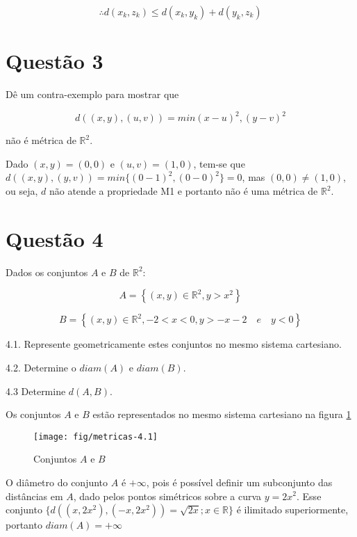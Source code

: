 \documentclass[10pt,a4paper]{article}
\begin{document}
	\begin{equation}\label{eq:M3a}
		\therefore d(x_k, z_k) \le d(x_k, y_k) + d(y_k, z_k)
	\end{equation}
	
	\section*{Questão 3}
	
	Dê um contra-exemplo para mostrar que
	
	\begin{equation}
		d((x, y), (u, v)) = min{(x-u)^2, (y-v)^2}
	\end{equation}
	
	não é métrica de $ \mathbb{R}^2$.
	
	Dado $ (x, y) = (0, 0) $ e $ (u, v) = (1, 0) $, tem-se que $ d((x, y), (y, v)) = min\{(0 - 1)^2, (0-0)^2\} = 0 $, mas $(0, 0) \neq (1, 0) $, ou seja, $d$ não atende a propriedade M1 e portanto não é uma métrica de $ \mathbb{R}^2$.
	\section*{Questão 4}
	
	Dados os conjuntos $A$ e $B$ de $\mathbb{R}^2$:
	
	\begin{equation*}
		A = \left\{ (x, y) \in \mathbb{R}^2, y > x^2 \right\}
	\end{equation*}
	
	\begin{equation*}
		B = \left\{ (x, y) \in \mathbb{R} ^2, -2 < x < 0, y > -x-2 \quad e \quad y < 0 \right\}
	\end{equation*}
	
	4.1. Represente geometricamente estes conjuntos no mesmo sistema cartesiano.
	
	4.2. Determine o $ diam(A) $ e $ diam(B) $.
	
	4.3 Determine $ d(A, B) $.
	
	Os conjuntos $A$ e $B$ estão representados no mesmo sistema cartesiano na figura \ref{fig:metricas-4}
	
	\begin{figure}[h]
		\centering
		\texttt{[image: fig/metricas-4.1]}
		\caption{Conjuntos $A$ e $B$}
		\label{fig:metricas-4}
	\end{figure}
	
	O diâmetro do conjunto $A$ é $+\infty$, pois é possível definir um subconjunto das distâncias em $A$, dado pelos pontos simétricos sobre a curva $y = 2x^2$. Esse conjunto $\{d((x, 2x^2), (-x, 2x^2) ) = \sqrt{2x}; x \in \mathbb{R}\}$ é ilimitado superiormente, portanto $diam(A) = +\infty$
	
\end{document}
